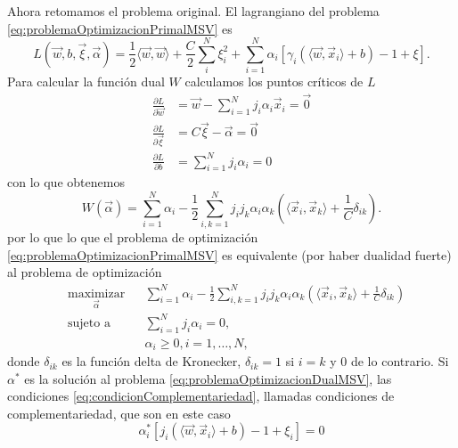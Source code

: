 \documentclass[letterpaper,12pt]{book}
\begin{document}
Ahora retomamos el problema original. El lagrangiano del problema \ref{eq:problemaOptimizacionPrimalMSV} es 
\begin{equation}
  L(\vec{w},b,\vec{\xi},\vec{\alpha}) = \frac{1}{2}\langle \vec{w}, \vec{w} \rangle + \frac{C}{2}\sum_{i}^{N}\xi_i^2 + \sum_{i=1}^{N}\alpha_i\left[\gamma_i(\langle \vec{w}, \vec{x}_i \rangle +b) -1 + \xi \right].
\end{equation}
Para calcular la función dual $W$ calculamos los puntos críticos de $L$
\begin{align}
    \frac{\partial L}{\partial\vec{w}} & = \vec{w} - \sum_{i=1}^{N}j_i\alpha_i\vec{x}_i = \vec{0}\label{eq:vectorPesoEnVarsDuales}\\
    \frac{\partial L}{\partial\vec{\xi}} & = C\vec{\xi}-\vec{\alpha} = \vec{0}\label{eq:alphaYXi}\\
    \frac{\partial L}{\partial b} & = \sum_{i=1}^{N}j_i\alpha_i = 0
\end{align}
con lo que obtenemos 
\begin{equation}
W(\vec{\alpha}) = \sum_{i=1}^N \alpha_i -\frac{1}{2}\sum_{i,k=1}^Nj_ij_k\alpha_i\alpha_k\left( \langle\vec{x}_i, \vec{x}_k\rangle + \frac{1}{C}\delta_{ik}  \right).
\end{equation}
por lo que lo que el problema de optimización \ref{eq:problemaOptimizacionPrimalMSV} es equivalente (por haber dualidad fuerte) al problema de optimización
\begin{equation}\label{eq:problemaOptimizacionDualMSV}
  \begin{aligned}
    & \underset{\vec{\alpha}}{\text{maximizar}}
    & & \sum_{i=1}^N \alpha_i -\frac{1}{2}\sum_{i,k=1}^Nj_ij_k\alpha_i\alpha_k\left( \langle\vec{x}_i, \vec{x}_k\rangle + \frac{1}{C}\delta_{ik}  \right)\\
    & \text{sujeto a}
    & & \sum_{i=1}^Nj_i\alpha_i = 0, \\
    & & & \alpha_i \geq 0, i = 1,\dots,N,
  \end{aligned}
\end{equation}
donde $\delta_{ik}$ es la función delta de Kronecker, $\delta_{ik} = 1$ si $i=k$ y $0$ de lo contrario. Si $\alpha^*$ es la solución al problema \ref{eq:problemaOptimizacionDualMSV}, las condiciones \ref{eq:condicionComplementariedad}, llamadas condiciones de complementariedad, que son en este caso 
\begin{equation}\label{eq:condicionComplementariedadMSV}
\alpha_{i}^{*}[j_i(\langle\vec{w},\vec{x}_i\rangle+b)-1+\xi_i] = 0
\end{equation}
\end{document}
